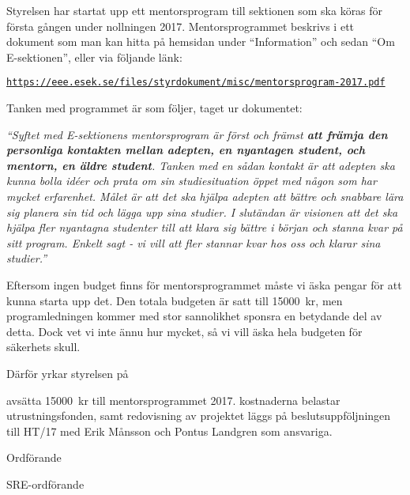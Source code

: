 \documentclass[../_main/handlingar.tex]{subfiles}
\begin{document}

Styrelsen har startat upp ett mentorsprogram till sektionen som ska köras för första gången under nollningen 2017. Mentorsprogrammet beskrivs i ett dokument som man kan hitta på hemsidan under ``Information'' och sedan ``Om E-sektionen'', eller via följande länk:

\href{https://eee.esek.se/files/styrdokument/misc/mentorsprogram-2017.pdf}{\texttt{https://eee.esek.se/files/styrdokument/misc/mentorsprogram-2017.pdf}}

Tanken med programmet är som följer, taget ur dokumentet:

\textit{``Syftet med E-sektionens mentorsprogram är först och främst \textbf{att främja den personliga kontakten mellan adepten, en nyantagen student, och mentorn, en äldre student}.
Tanken med en sådan kontakt är att adepten ska kunna bolla idéer och prata om sin studiesituation öppet med någon som har mycket erfarenhet.
Målet är att det ska hjälpa adepten att bättre och snabbare lära sig planera sin tid och lägga upp sina studier.
I slutändan är visionen att det ska hjälpa fler nyantagna studenter till att klara sig bättre i början och stanna kvar på sitt program.
Enkelt sagt - vi vill att fler stannar kvar hos oss och klarar sina studier.''}


Eftersom ingen budget finns för mentorsprogrammet måste vi äska pengar för att kunna starta upp det. Den totala budgeten är satt till \SI{15000}{kr}, men programledningen kommer med stor sannolikhet sponsra en betydande del av detta. Dock vet vi inte ännu hur mycket, så vi vill äska hela budgeten för säkerhets skull.

Därför yrkar styrelsen på

\begin{attsatser}
    \att avsätta \SI{15000}{kr} till mentorsprogrammet 2017.
    \att kostnaderna belastar utrustningsfonden, samt
    \att redovisning av projektet läggs på beslutsuppföljningen till HT/17 med Erik Månsson och Pontus Landgren som ansvariga.
\end{attsatser}

\begin{signatures}{2}
    \ist
    \signature{\ordf}{Ordförande}
    \signature{\sreordf}{SRE-ordförande}
\end{signatures}
\end{document}
